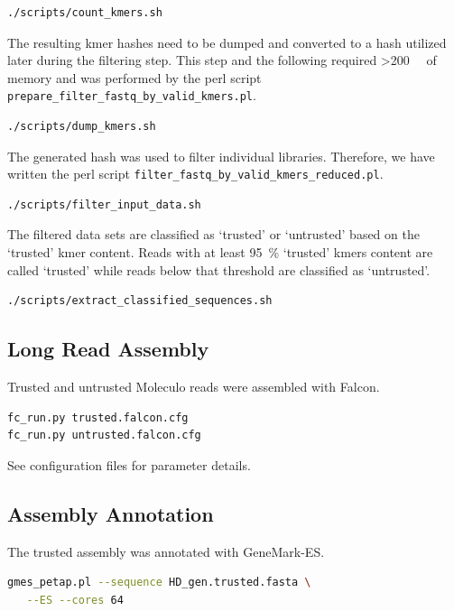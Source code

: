\documentclass[12pt,a4paper]{scrartcl}
\begin{document}
\begin{lstlisting}[language=bash]
./scripts/count_kmers.sh
\end{lstlisting}

The resulting kmer hashes need to be dumped and converted to a hash
utilized later during the filtering step. This step and the following
required \SI{>200}{\giga\byte} of memory and was performed by the perl
script \texttt{prepare\_filter\_fastq\_by\_valid\_kmers.pl}.

\begin{lstlisting}[language=bash]
./scripts/dump_kmers.sh
\end{lstlisting}

The generated hash was used to filter individual libraries. Therefore,
we have written the perl script
\texttt{filter\_fastq\_by\_valid\_kmers\_reduced.pl}.

\begin{lstlisting}[language=bash]
./scripts/filter_input_data.sh
\end{lstlisting}

The filtered data sets are classified as `trusted' or `untrusted'
based on the `trusted' kmer content. Reads with at least
\SI{95}{\percent} `trusted' kmers content are called `trusted'
while reads below that threshold are classified as `untrusted'.

\begin{lstlisting}[language=bash]
./scripts/extract_classified_sequences.sh
\end{lstlisting}

\subsection*{Long Read Assembly}

Trusted and untrusted Moleculo reads were assembled with Falcon.

\begin{lstlisting}[language=bash]
fc_run.py trusted.falcon.cfg
fc_run.py untrusted.falcon.cfg
\end{lstlisting}

See configuration files for parameter details.

\subsection*{Assembly Annotation}
The trusted assembly was annotated with GeneMark-ES.

\begin{lstlisting}[language=bash]
gmes_petap.pl --sequence HD_gen.trusted.fasta \
   --ES --cores 64
\end{lstlisting}
\end{document}

